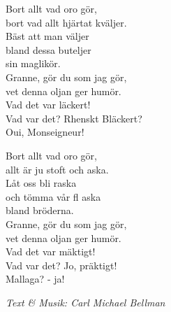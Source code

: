 \vspace{10pt}
Bort allt vad oro gör,\\
bort vad allt hjärtat kväljer.\\
Bäst att man väljer\\
bland dessa buteljer\\
sin maglikör.\\
Granne, gör du som jag gör,\\
vet denna oljan ger humör.\\
Vad det var läckert!\\
Vad var det? Rhenskt Bläckert?\\
Oui, Monseigneur!\par
\vspace{10pt}
Bort allt vad oro gör,\\
allt är ju stoft och aska.\\
Låt oss bli raska\\
och tömma vår fl aska\\
bland bröderna.\\
Granne, gör du som jag gör,\\
vet denna oljan ger humör.\\
Vad det var mäktigt!\\
Vad var det? Jo, präktigt!\\
Mallaga? - ja!\par
\vspace{10pt}
{\footnotesize\textit{Text \& Musik: Carl Michael Bellman}}
